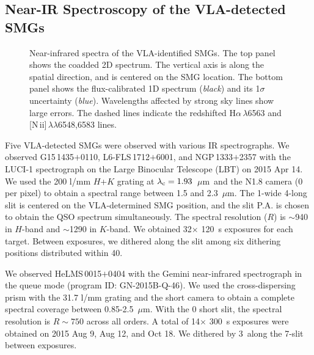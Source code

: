 \documentclass[iop,revtex4,twocolumn,apj,numberedappendix,appendixfloats]{emulateapj}
\newcommand{\um}{$\mu$m}
\newcommand{\Ha}{H$\alpha$}
\newcommand{\NII}{[N\,{\sc ii}]}
\begin{document}
\subsection{Near-IR Spectroscopy of the VLA-detected SMGs} 

\begin{figure*}[!tb]
\caption{Near-infrared spectra of the VLA-identified SMGs. The top panel shows the coadded 2D spectrum. The vertical axis is along the spatial direction, and is centered on the SMG location. The bottom panel shows the flux-calibrated 1D spectrum ({\it black}) and its 1$\sigma$ uncertainty ({\it blue}). Wavelengths affected by strong sky lines show large errors. The dashed lines indicate the redshifted \Ha\,$\lambda$6563 and \NII\,$\lambda\lambda$6548,6583 lines.
\label{fig:smgspec}} 
\end{figure*}

Five VLA-detected SMGs were observed with various IR spectrographs. 
%
We observed G15\,1435$+$0110, L6-FLS\,1712$+$6001, and NGP\,1333$+$2357 with the LUCI-1 spectrograph \citep{Seifert03} on the Large Binocular Telescope (LBT) on 2015 Apr 14. We used the 200 l/mm $H$+$K$ grating at $\lambda_{\rm c} = 1.93$~\um\ and the N1.8 camera (0 per pixel) to obtain a spectral range between 1.5 and 2.3~\um. The 1\arcsec-wide 4\arcmin-long slit is centered on the VLA-determined SMG position, and the slit P.A. is chosen to obtain the QSO spectrum simultaneously. The spectral resolution ($R$) is $\sim$940 in $H$-band and $\sim$1290 in $K$-band. We obtained 32$\times$ 120~s exposures for each target. Between exposures, we dithered along the slit among six dithering positions distributed within 40\arcsec. 

We observed HeLMS\,0015$+$0404 with the Gemini near-infrared spectrograph \citep[GNIRS;][]{Elias06} in the queue mode (program ID: GN-2015B-Q-46). We used the cross-dispersing prism with the 31.7 l/mm grating and the short camera to obtain a complete spectral coverage between 0.85-2.5~\um. With the 0 short slit, the spectral resolution is $R \sim 750$ across all orders. A total of 14$\times$ 300~s exposures were obtained on 2015 Aug 9, Aug 12, and Oct 18. We dithered by 3\arcsec\ along the 7\arcsec-slit between exposures.
\end{document}

